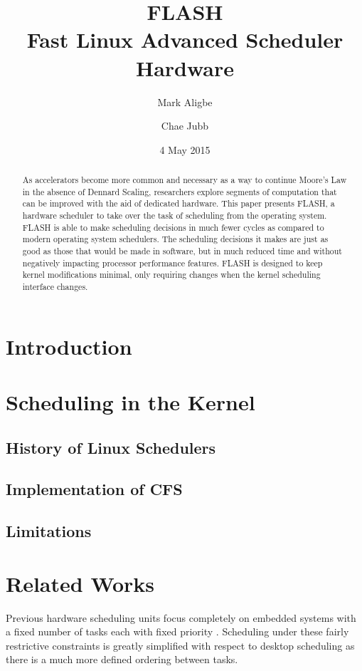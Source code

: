 \documentclass{sig-alternate-10pt}
\title{FLASH\\Fast Linux Advanced Scheduler Hardware}
\author{
	Mark Aligbe \\
	    \email{ma2799@columbia.edu}
	\and
    Chae Jubb \\
        \email{ecj2122@columbia.edu}
}
\date{4 May 2015}
\begin{document}
\maketitle

\begin{abstract}
As accelerators become more common and necessary as a way to continue Moore's Law in the absence of Dennard Scaling, researchers explore segments of computation that can be improved with the aid of dedicated hardware. This paper presents FLASH, a hardware scheduler to take over the task of scheduling from the operating system. FLASH is able to make scheduling decisions in much fewer cycles as compared to modern operating system schedulers. The scheduling decisions it makes are just as good as those that would be made in software, but in much reduced time and without negatively impacting processor performance features. FLASH is designed to keep kernel modifications minimal, only requiring changes when the kernel scheduling interface changes.

\end{abstract}


\section{Introduction}
\label{sec:intro}
\lipsum[1-3]


\section{Scheduling in the Kernel}
\label{sec:sched_in_kernel}
\subsection{History of Linux Schedulers}
\subsection{Implementation of CFS}
\subsection{Limitations}


\section{Related Works}
\label{sec:related_works}
Previous hardware scheduling units focus completely on embedded systems with
a fixed number of tasks each with fixed priority
\cite{kuacharoen2003configurable, morton2004hardware, nacul2007hardware, nakano1995hardware,
park2008hardware}.  Scheduling under these fairly restrictive constraints is
greatly simplified with respect to desktop scheduling as there is a much
more defined ordering between tasks.
\end{document}
